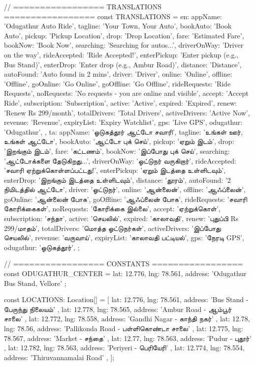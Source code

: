 // ================= TRANSLATIONS =================
const TRANSLATIONS = {
  en: {
    appName: 'Odugathur Auto Ride',
    tagline: 'Your Town, Your Auto',
    bookAuto: 'Book Auto',
    pickup: 'Pickup Location',
    drop: 'Drop Location',
    fare: 'Estimated Fare',
    bookNow: 'Book Now',
    searching: 'Searching for autos...',
    driverOnWay: 'Driver on the way',
    rideAccepted: 'Ride Accepted!',
    enterPickup: 'Enter pickup (e.g., Bus Stand)',
    enterDrop: 'Enter drop (e.g., Ambur Road)',
    distance: 'Distance',
    autoFound: 'Auto found in 2 mins',
    driver: 'Driver',
    online: 'Online',
    offline: 'Offline',
    goOnline: 'Go Online',
    goOffline: 'Go Offline',
    rideRequests: 'Ride Requests',
    noRequests: 'No requests - you are online and visible',
    accept: 'Accept Ride',
    subscription: 'Subscription',
    active: 'Active',
    expired: 'Expired',
    renew: 'Renew Rs 299/month',
    totalDrivers: 'Total Drivers',
    activeDrivers: 'Active Now',
    revenue: 'Revenue',
    expiryList: 'Expiry Watchlist',
    gps: 'Live GPS',
    odugathur: 'Odugathur',
  },
  ta: {
    appName: 'ஓடுகத்தூர் ஆட்டோ சவாரி',
    tagline: 'உங்கள் ஊர், உங்கள் ஆட்டோ',
    bookAuto: 'ஆட்டோ புக் செய்',
    pickup: 'ஏறும் இடம்',
    drop: 'இறங்கும் இடம்',
    fare: 'கட்டணம்',
    bookNow: 'இப்போது புக் செய்',
    searching: 'ஆட்டோக்களை தேடுகிறது...',
    driverOnWay: 'ஓட்டுநர் வருகிறார்',
    rideAccepted: 'சவாரி ஏற்றுக்கொள்ளப்பட்டது!',
    enterPickup: 'ஏறும் இடத்தை உள்ளிடவும்',
    enterDrop: 'இறங்கும் இடத்தை உள்ளிடவும்',
    distance: 'தூரம்',
    autoFound: '2 நிமிடத்தில் ஆட்டோ',
    driver: 'ஓட்டுநர்',
    online: 'ஆன்லைன்',
    offline: 'ஆஃப்லைன்',
    goOnline: 'ஆன்லைன் போக',
    goOffline: 'ஆஃப்லைன் போக',
    rideRequests: 'சவாரி கோரிக்கைகள்',
    noRequests: 'கோரிக்கை இல்லை',
    accept: 'ஏற்றுக்கொள்',
    subscription: 'சந்தா',
    active: 'செயலில்',
    expired: 'காலாவதி',
    renew: 'புதுப்பி Rs 299/மாதம்',
    totalDrivers: 'மொத்த ஓட்டுநர்கள்',
    activeDrivers: 'இப்போது செயலில்',
    revenue: 'வருவாய்',
    expiryList: 'காலாவதி பட்டியல்',
    gps: 'நேரடி GPS',
    odugathur: 'ஓடுகத்தூர்',
  }
};

// ================= CONSTANTS =================
const ODUGATHUR_CENTER = { lat: 12.776, lng: 78.561, address: 'Odugathur Bus Stand, Vellore' };

const LOCATIONS: Location[] = [
  { lat: 12.776, lng: 78.561, address: 'Bus Stand - பேருந்து நிலையம்' },
  { lat: 12.778, lng: 78.565, address: 'Ambur Road - ஆம்பூர் சாலை' },
  { lat: 12.772, lng: 78.558, address: 'Gandhi Nagar - காந்தி நகர்' },
  { lat: 12.78, lng: 78.56, address: 'Pallikonda Road - பள்ளிகொண்டா சாலை' },
  { lat: 12.775, lng: 78.567, address: 'Market - சந்தை' },
  { lat: 12.77, lng: 78.563, address: 'Pudur - புதூர்' },
  { lat: 12.782, lng: 78.563, address: 'Periyeri - பெரியேரி' },
  { lat: 12.774, lng: 78.554, address: 'Thiruvannamalai Road' },
];

